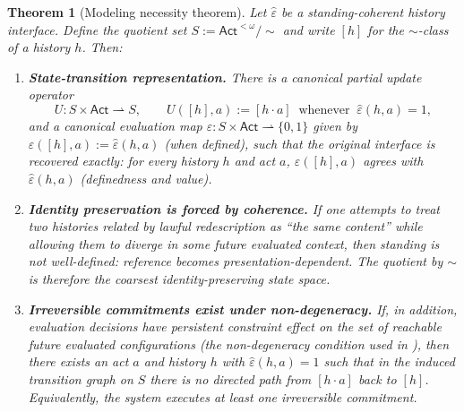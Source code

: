 \documentclass[11pt]{article}
\newtheorem{theorem}{Theorem}[section]
\theoremstyle{definition}
\newcommand{\Act}{\mathsf{Act}}
\newcommand{\ppar}{\rightharpoonup} %
\begin{document}
\begin{theorem}[Modeling necessity theorem]
\label{thm:modeling-necessity}
Let $\hat\varepsilon$ be a standing-coherent history interface.
Define the quotient set $S:=\Act^{<\omega}/\sim$ and write $[h]$ for the $\sim$-class of a history $h$.
Then:
\begin{enumerate}[label=\textbf{(M\arabic*)}, leftmargin=2.6em]
\item \textbf{State-transition representation.}
There is a canonical partial update operator
\[
U:S\times \Act \ppar S,\qquad
U([h],a):=[h\cdot a]\ \text{ whenever }\ \hat\varepsilon(h,a)=1,
\]
and a canonical evaluation map $\varepsilon:S\times\Act\ppar\{0,1\}$ given by $\varepsilon([h],a):=\hat\varepsilon(h,a)$
(when defined), such that the original interface is recovered exactly: for every history $h$ and act $a$,
$\varepsilon([h],a)$ agrees with $\hat\varepsilon(h,a)$ (definedness and value).
\item \textbf{Identity preservation is forced by coherence.}
If one attempts to treat two histories related by lawful redescription as ``the same content'' while allowing them to
diverge in some future evaluated context, then standing is not well-defined: reference becomes presentation-dependent.
The quotient by $\sim$ is therefore the coarsest identity-preserving state space.
\item \textbf{Irreversible commitments exist under non-degeneracy.}
If, in addition, evaluation decisions have persistent constraint effect on the set of reachable future evaluated
configurations (the non-degeneracy condition used in ),
then there exists an act $a$ and history $h$ with $\hat\varepsilon(h,a)=1$ such that in the induced transition graph on
$S$ there is no directed path from $[h\cdot a]$ back to $[h]$.
Equivalently, the system executes at least one irreversible commitment.
\end{enumerate}
\end{theorem}
\end{document}
